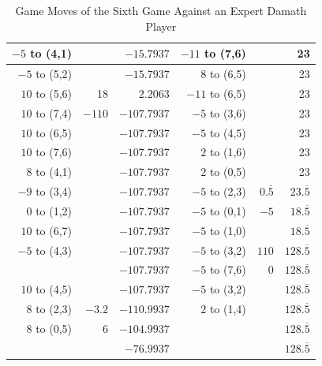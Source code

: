 \begin{appendices}
\begin{table}[H]
\begin{tabular}{rrrrrr}
          $-5$ to (4,1)  &        &  $-15.7937$ & $-11$ to (7,6) &    &  23    \\ \hline
          $-5$ to (5,2)  &        &  $-15.7937$ & $8$ to (6,5) &    &  23    \\ \hline
          $10$ to (5,6)  & 18     &  $2.2063$   & $-11$ to (6,5) &    &  23    \\ \hline
          $10$ to (7,4)  & $-110$   &  $-107.7937$ & $-5$ to (3,6) &    &  23    \\ \hline
          $10$ to (6,5)  &        &  $-107.7937$ & $-5$ to (4,5) &    &  23    \\ \hline
          $10$ to (7,6)  &        &  $-107.7937$ & $2$ to (1,6) &    &  23    \\ \hline
          $8$ to (4,1)  &        &  $-107.7937$ & $2$ to (0,5) &    &  23    \\ \hline
          $-9$ to (3,4)  &        &  $-107.7937$ & $-5$ to (2,3) & $0.\overline{5}$    &  $23.\overline5$   \\ \hline
          $0$ to (1,2)  &        &  $-107.7937$ & $-5$ to (0,1) & $-5$    &  $18.\overline5$   \\ \hline
          $10$ to (6,7) &        &  $-107.7937$ & $-5$ to (1,0) &         &  $18.\overline5$   \\ \hline
          $-5$ to (4,3) &        &  $-107.7937$ & $-5$ to (3,2) & $110$     &  $128.\overline5$   \\ \hline
                        &        &  $-107.7937$ & $-5$ to (7,6) & $0$       &  $128.\overline5$   \\ \hline
          $10$ to (4,5) &        &  $-107.7937$ & $-5$ to (3,2) &           &  $128.\overline5$   \\ \hline
          $8$ to (2,3) & $-3.2$  &  $-110.9937$ & $2$ to (1,4) &           &  $128.\overline5$   \\ \hline
          $8$ to (0,5) & 6       &  $-104.9937$ &              &           &  $128.\overline5$   \\ \hline \hline
                       &         &  $-76.9937$ &             &           &  $128.\overline5$   \\ \hline
    \end{tabular}
    \caption{Game Moves of the Sixth Game Against an Expert Damath Player}
    \label{tab:sixth-game}
\end{table}


\end{appendices}
